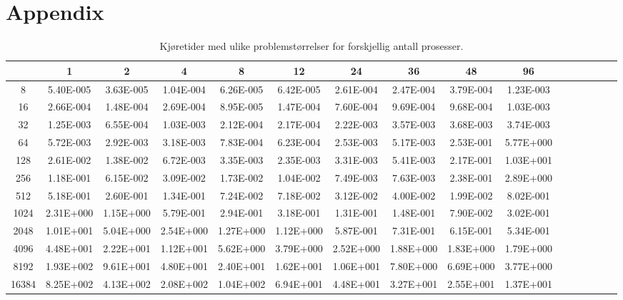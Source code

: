 \documentclass{article}
\begin{document}


\section{Appendix}
\begin{table}[h]
\label{table:wow_so_much_data}
\tiny
\begin{tabular}{c | c c c c c c c c c c c c c c c }
&1&2&4&8&12&24&36&48&96\\
\hline
8&5.40E-005&3.63E-005&1.04E-004&6.26E-005&6.42E-005&2.61E-004&2.47E-004&3.79E-004&1.23E-003\\
16&2.66E-004&1.48E-004&2.69E-004&8.95E-005&1.47E-004&7.60E-004&9.69E-004&9.68E-004&1.03E-003\\
32&1.25E-003&6.55E-004&1.03E-003&2.12E-004&2.17E-004&2.22E-003&3.57E-003&3.68E-003&3.74E-003\\
64&5.72E-003&2.92E-003&3.18E-003&7.83E-004&6.23E-004&2.53E-003&5.17E-003&2.53E-001&5.77E+000\\
128&2.61E-002&1.38E-002&6.72E-003&3.35E-003&2.35E-003&3.31E-003&5.41E-003&2.17E-001&1.03E+001\\
256&1.18E-001&6.15E-002&3.09E-002&1.73E-002&1.04E-002&7.49E-003&7.63E-003&2.38E-001&2.89E+000\\
512&5.18E-001&2.60E-001&1.34E-001&7.24E-002&7.18E-002&3.12E-002&4.00E-002&1.99E-002&8.02E-001\\
1024&2.31E+000&1.15E+000&5.79E-001&2.94E-001&3.18E-001&1.31E-001&1.48E-001&7.90E-002&3.02E-001\\
2048&1.01E+001&5.04E+000&2.54E+000&1.27E+000&1.12E+000&5.87E-001&7.31E-001&6.15E-001&5.34E-001\\
4096&4.48E+001&2.22E+001&1.12E+001&5.62E+000&3.79E+000&2.52E+000&1.88E+000&1.83E+000&1.79E+000\\
8192&1.93E+002&9.61E+001&4.80E+001&2.40E+001&1.62E+001&1.06E+001&7.80E+000&6.69E+000&3.77E+000\\
16384&8.25E+002&4.13E+002&2.08E+002&1.04E+002&6.94E+001&4.48E+001&3.27E+001&2.55E+001&1.37E+001\\
\end{tabular}
\caption{Kjøretider med ulike problemstørrelser for forskjellig antall prosesser.}
\end{table}
\end{document}
